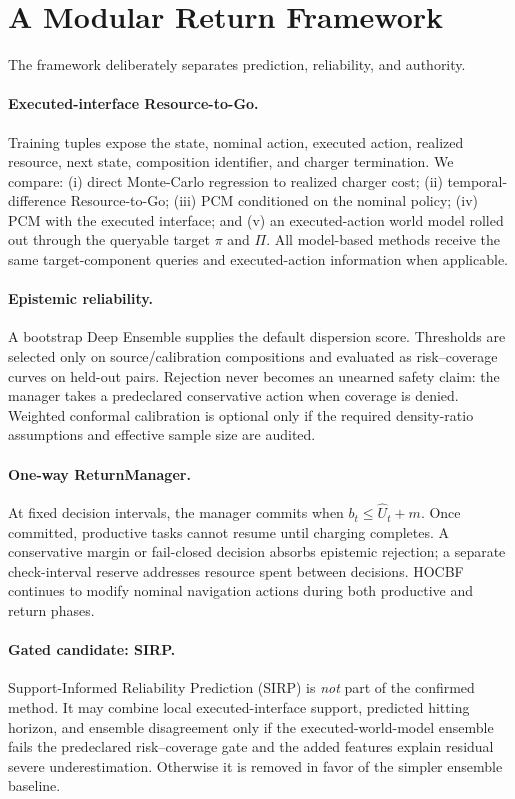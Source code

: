 \section{A Modular Return Framework}
\label{sec:method}

The framework deliberately separates prediction, reliability, and authority.

\paragraph{Executed-interface Resource-to-Go.}
Training tuples expose the state, nominal action, executed action, realized resource, next state, composition identifier, and charger termination. We compare: (i) direct Monte-Carlo regression to realized charger cost; (ii) temporal-difference Resource-to-Go; (iii) PCM conditioned on the nominal policy; (iv) PCM with the executed interface; and (v) an executed-action world model rolled out through the queryable target \(\pi\) and \(\Pi\). All model-based methods receive the same target-component queries and executed-action information when applicable.

\paragraph{Epistemic reliability.}
A bootstrap Deep Ensemble supplies the default dispersion score. Thresholds are selected only on source/calibration compositions and evaluated as risk--coverage curves on held-out pairs. Rejection never becomes an unearned safety claim: the manager takes a predeclared conservative action when coverage is denied. Weighted conformal calibration is optional only if the required density-ratio assumptions and effective sample size are audited.

\paragraph{One-way ReturnManager.}
At fixed decision intervals, the manager commits when \(b_t\leq\widehat U_t+m\). Once committed, productive tasks cannot resume until charging completes. A conservative margin or fail-closed decision absorbs epistemic rejection; a separate check-interval reserve addresses resource spent between decisions. HOCBF continues to modify nominal navigation actions during both productive and return phases.

\paragraph{Gated candidate: SIRP.}
Support-Informed Reliability Prediction (SIRP) is \emph{not} part of the confirmed method. It may combine local executed-interface support, predicted hitting horizon, and ensemble disagreement only if the executed-world-model ensemble fails the predeclared risk--coverage gate and the added features explain residual severe underestimation. Otherwise it is removed in favor of the simpler ensemble baseline.
